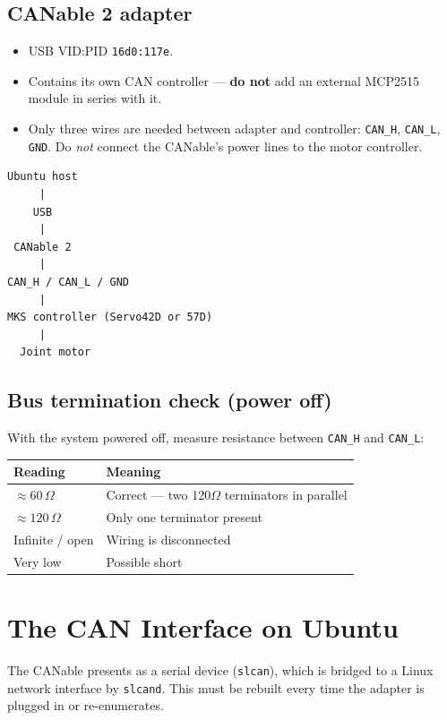 \documentclass[11pt,letterpaper]{article}
\begin{document}
\subsection{CANable 2 adapter}
\begin{itemize}
    \item USB VID:PID \texttt{16d0:117e}.
    \item Contains its own CAN controller --- \textbf{do not} add an external
          MCP2515 module in series with it.
    \item Only three wires are needed between adapter and controller:
          \texttt{CAN\_H}, \texttt{CAN\_L}, \texttt{GND}. Do \emph{not} connect the
          CANable's power lines to the motor controller.
\end{itemize}

\begin{lstlisting}[caption=Physical signal path]
Ubuntu host
     |
    USB
     |
 CANable 2
     |
CAN_H / CAN_L / GND
     |
MKS controller (Servo42D or 57D)
     |
  Joint motor
\end{lstlisting}

\subsection{Bus termination check (power off)}
With the system powered off, measure resistance between \texttt{CAN\_H} and
\texttt{CAN\_L}:

\begin{table}[h]
\centering
\begin{tabular}{ll}
\toprule
\textbf{Reading} & \textbf{Meaning} \\ \midrule
$\approx 60\,\Omega$  & Correct --- two 120$\Omega$ terminators in parallel \\
$\approx 120\,\Omega$ & Only one terminator present \\
Infinite / open       & Wiring is disconnected \\
Very low              & Possible short \\
\bottomrule
\end{tabular}
\end{table}

\section{The CAN Interface on Ubuntu}
\label{sec:can-interface}

The CANable presents as a serial device (\texttt{slcan}), which is bridged to a
Linux network interface by \texttt{slcand}. This must be rebuilt every time the
adapter is plugged in or re-enumerates.
\end{document}
